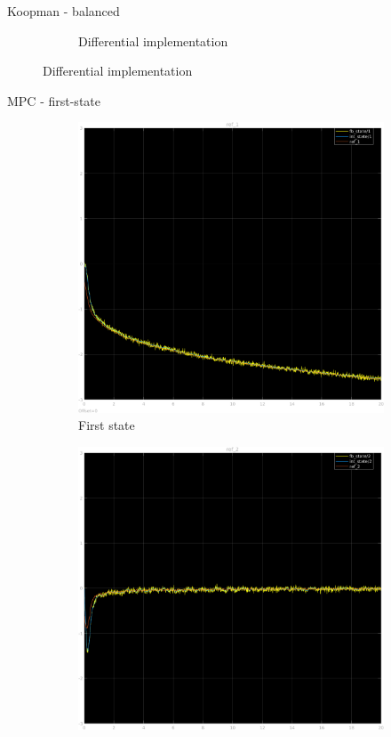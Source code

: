 \documentclass{beamer}
\begin{document}
\begin{frame}{Koopman - balanced}
\begin{figure}
\begin{subfigure}[b]{0.45\textwidth}
            \caption{Differential implementation}
        \end{subfigure}
    \end{figure}
\end{frame}

\begin{frame}{MPC - first-state}
    \begin{figure}
        \centering
        \begin{subfigure}[b]{0.45\textwidth}
            \centering
            \includegraphics[width=\textwidth]{first_mpc_1.png}
            \caption{First state}
        \end{subfigure}
        \hfill
        \begin{subfigure}[b]{0.45\textwidth}
            \centering
            \includegraphics[width=\textwidth]{first_mpc_2.png}

\end{subfigure}
\end{figure}
\end{frame}
\end{document}
